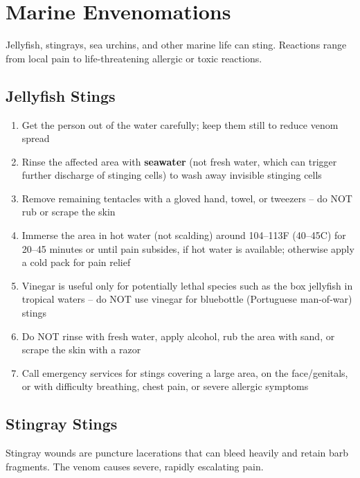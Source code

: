 \section{Marine Envenomations}

Jellyfish, stingrays, sea urchins, and other marine life can sting. Reactions range from local pain to life-threatening allergic or toxic reactions.

\subsection{Jellyfish Stings}

\begin{enumerate}[leftmargin=*]
\item Get the person out of the water carefully; keep them still to reduce venom spread
\item Rinse the affected area with \textbf{seawater} (not fresh water, which can trigger further discharge of stinging cells) to wash away invisible stinging cells
\item Remove remaining tentacles with a gloved hand, towel, or tweezers -- do NOT rub or scrape the skin
\item Immerse the area in hot water (not scalding) around 104--113\textdegree F (40--45\textdegree C) for 20--45 minutes or until pain subsides, if hot water is available; otherwise apply a cold pack for pain relief
\item Vinegar is useful only for potentially lethal species such as the box jellyfish in tropical waters -- do NOT use vinegar for bluebottle (Portuguese man-of-war) stings
\item Do NOT rinse with fresh water, apply alcohol, rub the area with sand, or scrape the skin with a razor
\item Call emergency services for stings covering a large area, on the face/genitals, or with difficulty breathing, chest pain, or severe allergic symptoms
\end{enumerate}

\subsection{Stingray Stings}

Stingray wounds are puncture lacerations that can bleed heavily and retain barb fragments. The venom causes severe, rapidly escalating pain.

